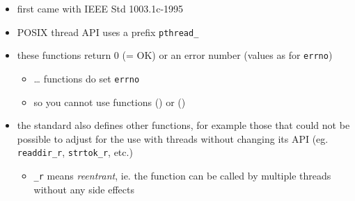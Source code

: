 \begin{slide}

\begin{itemize}
\item first came with IEEE Std 1003.1c-1995
\item POSIX thread API uses a prefix \texttt{pthread\_}
\item these functions return 0 (= OK) or an error number (values as for
\texttt{errno})
\begin{itemize}
\item \dots{} functions do  set \texttt{errno}
\item so you cannot use functions () or ()
\end{itemize}
\item the standard also defines other functions, for example those that could
not be possible to adjust for the use with threads without changing its API (eg.
\texttt{readdir\_r}, \texttt{strtok\_r}, etc.)
\begin{itemize}
\item \texttt{\_r} means \emph{reentrant}, ie. the function can be called by
multiple threads without any side effects
\end{itemize}
\end{itemize}

\end{slide}

\label{POSIXTHREADS}

